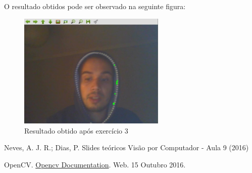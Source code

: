 \documentclass[portuguese, times, mirror]{revdetua}
\begin{document}
O resultado obtidos pode ser observado na seguinte figura:

\begin{figure}[ht!]
\centering
\includegraphics[width=70mm]{img/ex3.jpg}
\caption{Resultado obtido após exercício 3}
\end{figure}





\begin{thebibliography}{1} %

Neves, A. J. R.; Dias, P. Slides teóricos Visão por Computador - Aula 9 (2016)

OpenCV. \href{hhttp://docs.opencv.org/}{Opencv Documentation}. Web. 15 Outubro 2016. 




\end{thebibliography}
\end{document}
